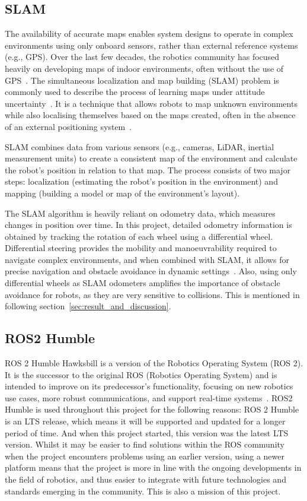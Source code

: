 \subsection{SLAM}
\label{subsec:slam}
The availability of accurate maps enables system designs to operate in complex environments using only onboard sensors, 
rather than external reference systems (e.g., GPS). 
Over the last few decades, the robotics community has focused heavily on developing maps of indoor environments, often without the use of GPS~\cite{slam}. 
The simultaneous localization and map building (SLAM) problem is commonly used to describe the process of learning maps under attitude uncertainty~\cite{slamoverview}. 
It is a technique that allows robots to map unknown environments while also localising themselves based on the maps created, 
often in the absence of an external positioning system~\cite{slamii}.

SLAM combines data from various sensors 
(e.g., cameras, LiDAR, inertial measurement units) to create a consistent map of the environment and calculate the robot's position in relation to that map. 
The process consists of two major steps: localization (estimating the robot's position in the environment) and mapping (building a model or map of the environment's layout).

The SLAM algorithm is heavily reliant on odometry data, which measures changes in position over time. 
In this project, detailed odometry information is obtained by tracking the rotation of each wheel using a differential wheel. 
Differential steering provides the mobility and manoeuvrability required to navigate complex environments, 
and when combined with SLAM, it allows for precise navigation and obstacle avoidance in dynamic settings~\cite{slamtutorial}. 
Also, using only differential wheels as SLAM odometers amplifies the importance of obstacle avoidance for robots, 
as they are very sensitive to collisions. This is mentioned in following section~\ref{sec:result_and_discussion}.

\subsection{ROS2 Humble}
ROS 2 Humble Hawksbill is a version of the Robotics Operating System (ROS 2).
It is the successor to the original ROS (Robotics Operating System) and is intended to improve on its predecessor's functionality,
focusing on new robotics use cases, more robust communications, and support real-time systems~\cite{ros2}.
ROS2 Humble is used throughout this project for the following reasons: ROS 2 Humble is an LTS release, 
which means it will be supported and updated for a longer period of time. 
And when this project started, this version was the latest LTS version. 
Whilst it may be easier to find solutions within the ROS community when the project encounters problems using an earlier version, 
using a newer platform means that the project is more in line with the ongoing developments in the field of robotics, 
and thus easier to integrate with future technologies and standards emerging in the community. This is also a mission of this project.

